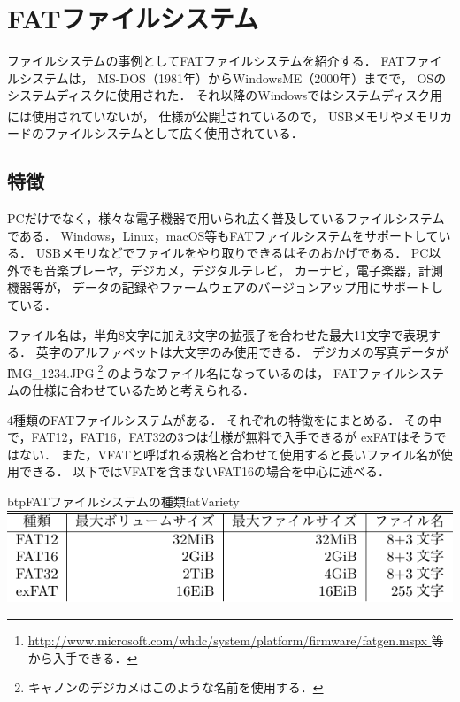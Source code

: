 \chapter{FATファイルシステム}
ファイルシステムの事例としてFATファイルシステムを紹介する．
FATファイルシステムは，
MS-DOS（1981年）からWindowsME（2000年）までで，
OSのシステムディスクに使用された．
それ以降のWindowsではシステムディスク用には使用されていないが，
仕様が公開\footnote{
  \url{http://www.microsoft.com/whdc/system/platform/firmware/fatgen.mspx
  }等から入手できる．}されているので，
USBメモリやメモリカードのファイルシステムとして広く使用されている．

\section{特徴}
PCだけでなく，様々な電子機器で用いられ広く普及しているファイルシステムである．
Windows，Linux，macOS等もFATファイルシステムをサポートしている．
USBメモリなどでファイルをやり取りできるはそのおかげである．
PC以外でも音楽プレーヤ，デジカメ，デジタルテレビ，
カーナビ，電子楽器，計測機器等が，
データの記録やファームウェアのバージョンアップ用にサポートしている．

ファイル名は，半角8文字に加え3文字の拡張子を合わせた最大11文字で表現する．
英字のアルファベットは大文字のみ使用できる．
デジカメの写真データが\|IMG_1234.JPG|\footnote{
  キャノンのデジカメはこのような名前を使用する．}
のようなファイル名になっているのは，
FATファイルシステムの仕様に合わせているためと考えられる．

4種類のFATファイルシステムがある．
それぞれの特徴をにまとめる．
その中で，FAT12，FAT16，FAT32の3つは仕様が無料で入手できるが
exFATはそうではない．
また，VFATと呼ばれる規格と合わせて使用すると長いファイル名が使用できる．
以下ではVFATを含まないFAT16の場合を中心に述べる．

\begin{mytable}{btp}{FATファイルシステムの種類}{fatVariety}
  \includegraphics[scale=1.0]{Tbl/fatVariety.pdf}
\end{mytable}

